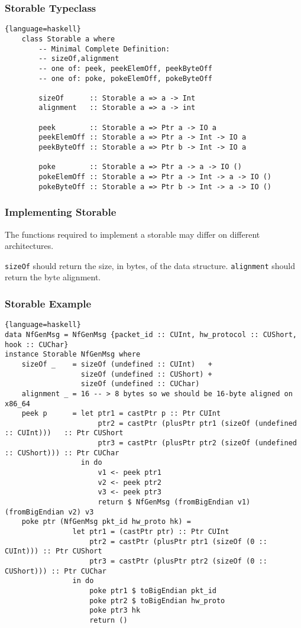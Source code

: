\documentclass{beamer}
\begin{document}
\begin{frame}[fragile]
    \frametitle{Storable Typeclass}
    \begin{lstlisting}{language=haskell}
    class Storable a where
        -- Minimal Complete Definition:
        -- sizeOf,alignment
        -- one of: peek, peekElemOff, peekByteOff
        -- one of: poke, pokeElemOff, pokeByteOff

        sizeOf      :: Storable a => a -> Int
        alignment   :: Storable a => a -> int

        peek        :: Storable a => Ptr a -> IO a
        peekElemOff :: Storable a => Ptr a -> Int -> IO a
        peekByteOff :: Storable a => Ptr b -> Int -> IO a

        poke        :: Storable a => Ptr a -> a -> IO ()
        pokeElemOff :: Storable a => Ptr a -> Int -> a -> IO ()
        pokeByteOff :: Storable a => Ptr b -> Int -> a -> IO ()
    \end{lstlisting}
\end{frame}
\begin{frame}
    \frametitle{Implementing Storable}

    The functions required to implement a storable may differ on different
    architectures.

    {\tt sizeOf} should return the size, in bytes, of the data structure.
    {\tt alignment} should return the byte alignment.  
\end{frame}
\begin{frame}[fragile]
    \frametitle{Storable Example}
    \begin{lstlisting}{language=haskell}
data NfGenMsg = NfGenMsg {packet_id :: CUInt, hw_protocol :: CUShort, hook :: CUChar}
instance Storable NfGenMsg where
    sizeOf _    = sizeOf (undefined :: CUInt)   +
                  sizeOf (undefined :: CUShort) +
                  sizeOf (undefined :: CUChar)
    alignment _ = 16 -- > 8 bytes so we should be 16-byte aligned on x86_64
    peek p      = let ptr1 = castPtr p :: Ptr CUInt
                      ptr2 = castPtr (plusPtr ptr1 (sizeOf (undefined :: CUInt)))   :: Ptr CUShort
                      ptr3 = castPtr (plusPtr ptr2 (sizeOf (undefined :: CUShort))) :: Ptr CUChar
                  in do
                      v1 <- peek ptr1
                      v2 <- peek ptr2
                      v3 <- peek ptr3
                      return $ NfGenMsg (fromBigEndian v1) (fromBigEndian v2) v3
    poke ptr (NfGenMsg pkt_id hw_proto hk) =
                let ptr1 = (castPtr ptr) :: Ptr CUInt
                    ptr2 = castPtr (plusPtr ptr1 (sizeOf (0 :: CUInt))) :: Ptr CUShort
                    ptr3 = castPtr (plusPtr ptr2 (sizeOf (0 :: CUShort))) :: Ptr CUChar
                in do
                    poke ptr1 $ toBigEndian pkt_id
                    poke ptr2 $ toBigEndian hw_proto
                    poke ptr3 hk
                    return ()
    \end{lstlisting}
\end{frame}
\end{document}
